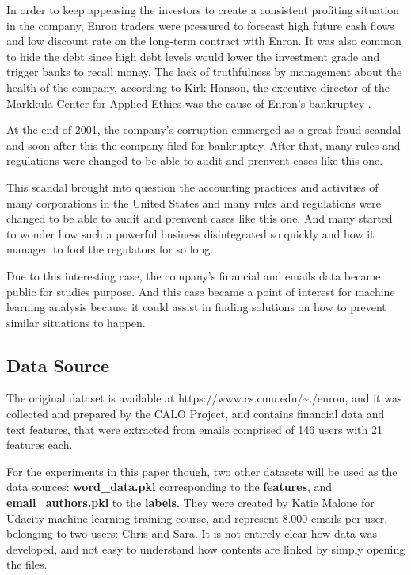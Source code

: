 \documentclass[11pt]{article}
\begin{document}
\begin{multicols}{2}
In order to keep appeasing the investors to create a consistent
profiting situation in the company, Enron traders were pressured to
forecast high future cash flows and low discount rate on the long-term
contract with Enron. It was also common to hide the debt since high debt
levels would lower the investment grade and trigger banks to recall
money. The lack of truthfulness by management about the health of the
company, according to Kirk Hanson, the executive director of the
Markkula Center for Applied Ethics was the cause of Enron's bankruptcy
\cite{li2010case}.

At the end of 2001, the company's corruption emmerged as a great fraud
scandal and soon after this the company filed for bankruptcy. After
that, many rules and regulations were changed to be able to audit and
prenvent cases like this one.

This scandal brought into question the accounting practices and
activities of many corporations in the United States and many rules and
regulations were changed to be able to audit and prenvent cases like
this one. And many started to wonder how such a powerful business
disintegrated so quickly and how it managed to fool the regulators for
so long.

Due to this interesting case, the company's financial and emails data
became public for studies purpose. And this case became a point of
interest for machine learning analysis because it could assist in
finding solutions on how to prevent similar situations to happen.

    \subsection{Data Source}\label{data-source}

The original dataset is available at
https://www.cs.cmu.edu/\textasciitilde{}./enron, and it was collected
and prepared by the CALO Project, and contains financial data and text
features, that were extracted from emails comprised of 146 users with 21
features each.

For the experiments in this paper though, two other datasets will be
used as the data sources: \textbf{word\_data.pkl} corresponding to the
\textbf{features}, and \textbf{email\_authors.pkl} to the
\textbf{labels}. They were created by Katie Malone for Udacity machine
learning training course, and represent 8.000 emails per user, belonging
to two users: Chris and Sara. It is not entirely clear how data was
developed, and not easy to understand how contents are linked by simply
opening the files.


\end{multicols}
\end{document}
